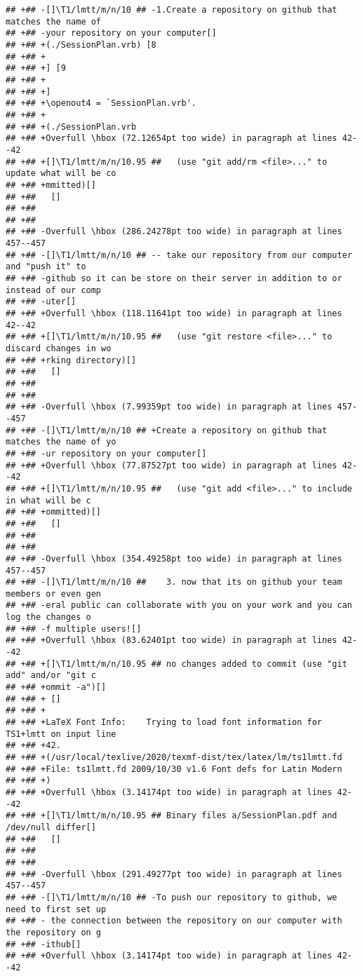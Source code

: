 \documentclass[ignorenonframetext,]{beamer}
\begin{document}
\begin{verbatim}
## +## -[]\T1/lmtt/m/n/10 ## -1.Create a repository on github that matches the name of 
## +## -your repository on your computer[] 
## +## +(./SessionPlan.vrb) [8
## +## +
## +## +] [9
## +## +
## +## +]
## +## +\openout4 = `SessionPlan.vrb'.
## +## +
## +## +(./SessionPlan.vrb
## +## +Overfull \hbox (72.12654pt too wide) in paragraph at lines 42--42
## +## +[]\T1/lmtt/m/n/10.95 ##   (use "git add/rm <file>..." to update what will be co
## +## +mmitted)[] 
## +##   []
## +##  
## +##  
## +## -Overfull \hbox (286.24278pt too wide) in paragraph at lines 457--457
## +## -[]\T1/lmtt/m/n/10 ## -- take our repository from our computer and "push it" to 
## +## -github so it can be store on their server in addition to or instead of our comp
## +## -uter[] 
## +## +Overfull \hbox (118.11641pt too wide) in paragraph at lines 42--42
## +## +[]\T1/lmtt/m/n/10.95 ##   (use "git restore <file>..." to discard changes in wo
## +## +rking directory)[] 
## +##   []
## +##  
## +##  
## +## -Overfull \hbox (7.99359pt too wide) in paragraph at lines 457--457
## +## -[]\T1/lmtt/m/n/10 ## +Create a repository on github that matches the name of yo
## +## -ur repository on your computer[] 
## +## +Overfull \hbox (77.87527pt too wide) in paragraph at lines 42--42
## +## +[]\T1/lmtt/m/n/10.95 ##   (use "git add <file>..." to include in what will be c
## +## +ommitted)[] 
## +##   []
## +##  
## +##  
## +## -Overfull \hbox (354.49258pt too wide) in paragraph at lines 457--457
## +## -[]\T1/lmtt/m/n/10 ##    3. now that its on github your team members or even gen
## +## -eral public can collaborate with you on your work and you can log the changes o
## +## -f multiple users![] 
## +## +Overfull \hbox (83.62401pt too wide) in paragraph at lines 42--42
## +## +[]\T1/lmtt/m/n/10.95 ## no changes added to commit (use "git add" and/or "git c
## +## +ommit -a")[] 
## +## + []
## +## +
## +## +LaTeX Font Info:    Trying to load font information for TS1+lmtt on input line 
## +## +42.
## +## +(/usr/local/texlive/2020/texmf-dist/tex/latex/lm/ts1lmtt.fd
## +## +File: ts1lmtt.fd 2009/10/30 v1.6 Font defs for Latin Modern
## +## +)
## +## +Overfull \hbox (3.14174pt too wide) in paragraph at lines 42--42
## +## +[]\T1/lmtt/m/n/10.95 ## Binary files a/SessionPlan.pdf and /dev/null differ[] 
## +##   []
## +##  
## +##  
## +## -Overfull \hbox (291.49277pt too wide) in paragraph at lines 457--457
## +## -[]\T1/lmtt/m/n/10 ## -To push our repository to github, we need to first set up
## +## - the connection between the repository on our computer with the repository on g
## +## -ithub[] 
## +## +Overfull \hbox (3.14174pt too wide) in paragraph at lines 42--42

\end{verbatim}
\end{document}
